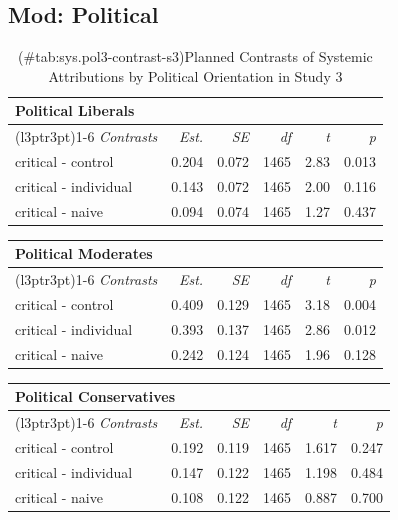 \documentclass[
]{book}
\begin{document}
\hypertarget{mod-political-14}{%
\subsection{Mod: Political}\label{mod-political-14}}

\begin{table}

\caption{(\#tab:sys.pol3-contrast-s3)Planned Contrasts of Systemic Attributions by Political Orientation in Study 3}
\centering
\fontsize{13}{15}\selectfont
\begin{tabular}[t]{lrrrrr}
\toprule
\multicolumn{6}{l}{Political Liberals} \\
\cmidrule(l{3pt}r{3pt}){1-6}
\em{Contrasts} & \em{Est.} & \em{SE} & \em{df} & \em{t} & \em{p}\\
\midrule
critical - control & 0.204 & 0.072 & 1465 & 2.83 & 0.013\\
critical - individual & 0.143 & 0.072 & 1465 & 2.00 & 0.116\\
critical - naive & 0.094 & 0.074 & 1465 & 1.27 & 0.437\\
\bottomrule
\end{tabular}
\end{table}

\begin{table}
\centering
\fontsize{13}{15}\selectfont
\begin{tabular}{lrrrrr}
\toprule
\multicolumn{6}{l}{Political Moderates} \\
\cmidrule(l{3pt}r{3pt}){1-6}
\em{Contrasts} & \em{Est.} & \em{SE} & \em{df} & \em{t} & \em{p}\\
\midrule
critical - control & 0.409 & 0.129 & 1465 & 3.18 & 0.004\\
critical - individual & 0.393 & 0.137 & 1465 & 2.86 & 0.012\\
critical - naive & 0.242 & 0.124 & 1465 & 1.96 & 0.128\\
\bottomrule
\end{tabular}
\end{table}

\begin{table}
\centering
\fontsize{13}{15}\selectfont
\begin{tabular}{lrrrrr}
\toprule
\multicolumn{6}{l}{Political Conservatives} \\
\cmidrule(l{3pt}r{3pt}){1-6}
\em{Contrasts} & \em{Est.} & \em{SE} & \em{df} & \em{t} & \em{p}\\
\midrule
critical - control & 0.192 & 0.119 & 1465 & 1.617 & 0.247\\
critical - individual & 0.147 & 0.122 & 1465 & 1.198 & 0.484\\
critical - naive & 0.108 & 0.122 & 1465 & 0.887 & 0.700\\
\bottomrule
\end{tabular}
\end{table}
\end{document}
